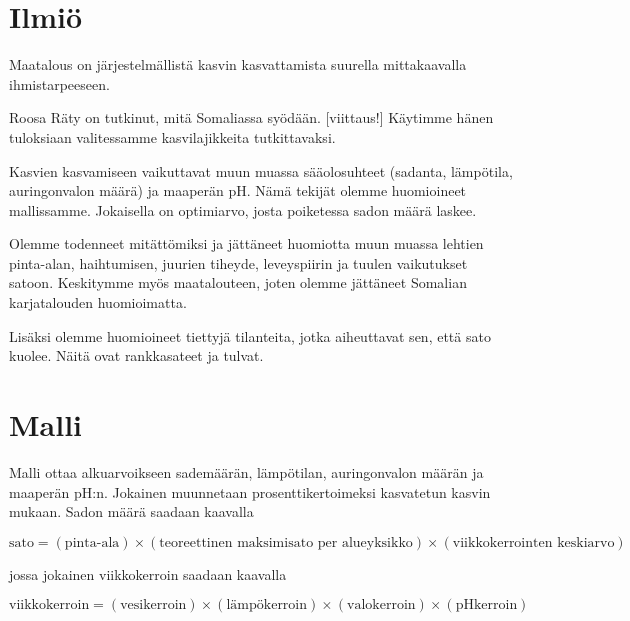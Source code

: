 \documentclass[12pt]{scrreprt}
\begin{document}
  \section{Ilmiö}

  Maatalous on järjestelmällistä kasvin kasvattamista suurella mittakaavalla
  ihmistarpeeseen.


  Roosa Räty on tutkinut, mitä Somaliassa syödään. [viittaus!] Käytimme hänen
  tuloksiaan valitessamme kasvilajikkeita tutkittavaksi.
  
  Kasvien kasvamiseen vaikuttavat muun muassa sääolosuhteet (sadanta, lämpötila,
  auringonvalon määrä) ja maaperän pH. Nämä tekijät olemme huomioineet
  mallissamme. Jokaisella on optimiarvo, josta poiketessa sadon määrä laskee.

  Olemme todenneet mitättömiksi ja jättäneet huomiotta muun muassa lehtien
  pinta-alan, haihtumisen, juurien tiheyde, leveyspiirin ja tuulen vaikutukset
  satoon. Keskitymme myös maatalouteen, joten olemme jättäneet Somalian
  karjatalouden huomioimatta.
  
  Lisäksi olemme huomioineet tiettyjä tilanteita, jotka aiheuttavat sen, että
  sato kuolee. Näitä ovat rankkasateet ja tulvat.
  
  \section{Malli}

  Malli ottaa alkuarvoikseen sademäärän, lämpötilan, auringonvalon määrän ja
  maaperän pH:n. Jokainen muunnetaan prosenttikertoimeksi kasvatetun kasvin
  mukaan. Sadon määrä saadaan kaavalla

  \begin{em}
  $ \text{sato} = (\text{pinta-ala}) \times (\text{teoreettinen maksimisato per
  alueyksikko}) \times (\text{viikkokerrointen keskiarvo}) $\end{em}
  jossa jokainen viikkokerroin saadaan kaavalla

  \begin{em}
  $ \text{viikkokerroin} = (\text{vesikerroin}) \times (\text{lämpökerroin})
  \times (\text{valokerroin}) \times (\text{pHkerroin}) $\end{em}



\end{document}

